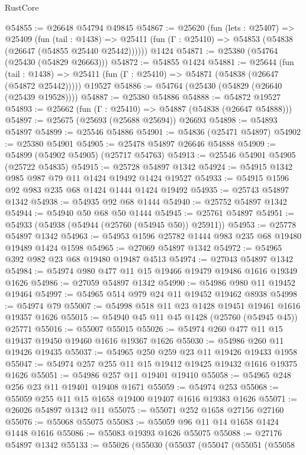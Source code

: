 \begin{lexlean}{RustCore}
\begin{coremodule}
@54855 := @26648 @54794 @49845
@54867 := @25620
    (fun (lets : @25407) =>
    @25409
      (fun (tail : @1438) =>
      @25411 (fun (Γ : @25410) => @54853 (@54838 (@26647 (@54855 @25440 @25442))))))
    @1424
@54871 := @25380 (@54764 (@25430 (@54829 @26663)))
@54872 := @54855 @1424
@54881 := @25644
    (fun (tail : @1438) => @25411 (fun (Γ : @25410) => @54871 (@54838 (@26647 (@54872 @25442)))))
    @19527
@54886 := @54764 (@25430 (@54829 (@26640 (@25439 @19528))))
@54887 := @25380 @54886
@54888 := @54872 @19527
@54893 := @25662 (fun (Γ : @25410) => @54887 (@54838 (@26647 @54888)))
@54897 := @25675 (@25693 (@25688 @25694)) @26693
@54898 := @54893 @54897
@54899 := @25546 @54886
@54901 := @54836 (@25471 @54897)
@54902 := @25380 @54901
@54905 := @25478 @54897 @26646 @54888
@54909 := @54899 (@54902 @54905) (@25717 @54763)
@54913 := @25546 @54901 @54905 (@25722 @54835)
@54915 := @25728 @54897 @1342
@54924 := @54915 @1342 @985 @987 @79 @11 @1424 @19492 @1424 @19527
@54933 := @54915 @1596 @92 @983 @235 @68 @1424 @1444 @1424 @19492
@54935 := @25743 @54897 @1342
@54938 := @54935 @92 @68 @1444
@54940 := @25752 @54897 @1342
@54944 := @54940 @50 @68 @50 @1444
@54945 := @25761 @54897
@54951 := @54933 (@54938 (@54944 (@25760 (@54945 @50)) @25911))
@54953 := @25778 @54897 @1342
@54963 := @54953 @1596 @25782 @1444 @983 @235 @68 @19480 @19489 @1424 @1598
@54965 := @27069 @54897 @1342
@54972 := @54965 @392 @982 @23 @68 @19480 @19487 @4513
@54974 := @27043 @54897 @1342
@54984 := @54974 @980 @477 @11 @15 @19466 @19479 @19486 @1616 @19349 @1626
@54986 := @27059 @54897 @1342
@54990 := @54986 @980 @11 @19452 @19464
@54997 := @54965 @514 @979 @24 @11 @19452 @19462 @8938
@54998 := @54974 @79
@55007 := @54998 @518 @11 @23 @1428 @19451 @19461 @1616 @19357 @1626
@55015 := @54940 @45 @11 @45 @1428 (@25760 (@54945 @45)) @25771
@55016 := @55007 @55015
@55026 := @54974 @260 @477 @11 @15 @19437 @19450 @19460 @1616 @19367 @1626
@55030 := @54986 @260 @11 @19426 @19435
@55037 := @54965 @250 @259 @23 @11 @19426 @19433 @1958
@55047 := @54974 @257 @255 @11 @15 @19412 @19425 @19432 @1616 @19375 @1626
@55051 := @54986 @257 @11 @19401 @19410
@55058 := @54965 @248 @256 @23 @11 @19401 @19408 @1671
@55059 := @54974 @253
@55068 := @55059 @255 @11 @15 @1658 @19400 @19407 @1616 @19383 @1626
@55071 := @26026 @54897 @1342 @11
@55075 := @55071 @252 @1658 @27156 @27160
@55076 := @55068 @55075
@55083 := @55059 @96 @11 @14 @1658 @1424 @1448 @1616
@55086 := @55083 @19393 @1626 @55075
@55088 := @27176 @54897 @1342
@55133 := @55026
    (@55030
      (@55037
        (@55047
          (@55051
            (@55058

\end{coremodule}
\end{lexlean}
